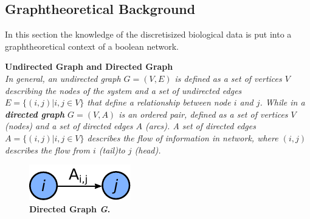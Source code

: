 \subsection{Graphtheoretical Background}
In this section the knowledge of the discretisized biological data is put into a graphtheoretical context of a boolean network.
\begin{defn}
\textbf{Undirected Graph and Directed Graph}\\
\textit{In general, an undirected graph $G=(V,E)$ is defined as a set of vertices $V$ describing the nodes of the system and a set of undirected edges $E = \{ (i,j)|i,j\in V\} $ that define a relationship between node $i$ and $j$. While in a \textbf{directed graph} $G=(V,A)$ is an ordered pair, defined as a set of vertices $V$ (nodes) and a set of directed edges $A$ (arcs). A set of directed edges $A=\{ (i,j)|i,j\in V\} $ describes the flow of information in network, where $(i,j)$ describes the flow from $i$ (tail)to $j$ (head).}\\
\end{defn} 


\begin{figure}[H]
\vspace{-20px}
\centering
\includegraphics{./Bilder/DirectedGraph.pdf}
\caption[Directed Graph]{\textbf{Directed Graph \textit{G}. } }
\label{fig:7}
\end{figure}





